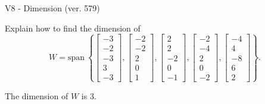 \begin{exercise}
  \begin{exerciseTitle}V8 - Dimension (ver. 579)\end{exerciseTitle}
  \begin{exerciseStatement}
    Explain how to find the dimension of 
\[W=\mathrm{span}\ \left\{\left[\begin{array}{r}
-3 \\
-2 \\
-3 \\
3 \\
-3
\end{array}\right] , \left[\begin{array}{r}
-2 \\
-2 \\
2 \\
0 \\
1
\end{array}\right] , \left[\begin{array}{r}
2 \\
2 \\
-2 \\
0 \\
-1
\end{array}\right] , \left[\begin{array}{r}
-2 \\
-4 \\
2 \\
0 \\
-2
\end{array}\right] , \left[\begin{array}{r}
-4 \\
4 \\
-8 \\
6 \\
2
\end{array}\right]\right\}.\]



  \end{exerciseStatement}
  \begin{exerciseAnswer}
   The dimension of \(W\) is  \(3\).
  


  \end{exerciseAnswer}
\end{exercise}